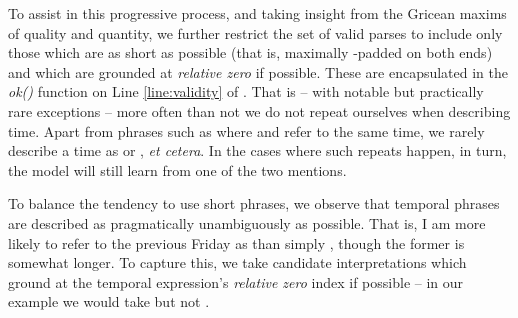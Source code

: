 To assist in this progressive process, and taking insight from the Gricean 
	maxims of quality and quantity, we further restrict the set of valid 
	parses to include only those which are as short as possible
	(that is, maximally -padded on both ends) and which are grounded
	at \textit{relative zero} if possible.
These are encapsulated in the \textit{ok()} function
	on Line \ref{line:validity} of .
That is -- with notable but practically rare exceptions --
	more often than not we do not repeat ourselves when describing time.
Apart from phrases such as  where 
	and  refer to the same time, we rarely describe a time as
	 or , \textit{et cetera}.
In the cases where such repeats happen, in turn, the model will still learn
	from one of the two mentions.

To balance the tendency to use short phrases, we observe that
	temporal phrases are described as pragmatically unambiguously as possible.
That is, I am more likely to refer to the previous Friday as 
	than simply , though the former is somewhat longer.
To capture this, we take candidate interpretations which ground at the
	temporal expression's \textit{relative zero} index if possible --
	in our example we would take  but not .

